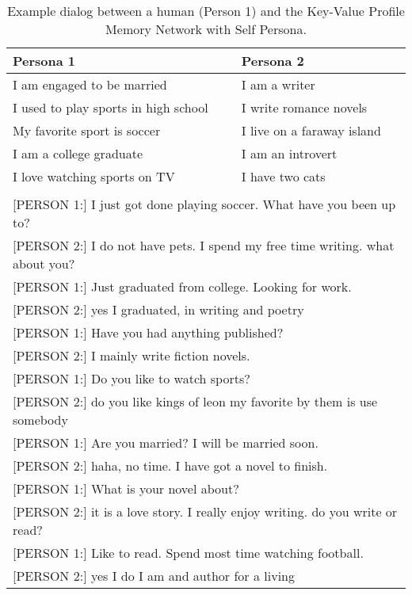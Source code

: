 \begin{table*}[t]
  \begin{center}
    \begin{small}
      \begin{tabular}{l|l}
        \toprule
        \textbf{Persona 1} & \textbf{Persona 2}\\
        \midrule
I am engaged to be married & I am a writer \\ 
I used to play sports in high school & I write romance novels\\
My favorite sport is soccer &  I live on a faraway island \\
I am a college graduate& I am an introvert \\
I love watching sports on TV& I have two cats \\
\bottomrule
\multicolumn{2}{l}{ }\\
\multicolumn{2}{l}{[PERSON 1:] I just got done playing soccer. What have you been up to?}\\
\multicolumn{2}{l}{[PERSON 2:] I do not have pets. I spend my free time writing. what about you?}\\
\multicolumn{2}{l}{[PERSON 1:] Just graduated from college. Looking for work. }\\
\multicolumn{2}{l}{[PERSON 2:] yes I graduated, in writing and poetry}\\
\multicolumn{2}{l}{[PERSON 1:] Have you had anything published?}\\
\multicolumn{2}{l}{[PERSON 2:] I mainly write fiction novels.}\\
\multicolumn{2}{l}{[PERSON 1:] Do you like to watch sports?}\\
\multicolumn{2}{l}{[PERSON 2:] do you like kings of leon my favorite by them is use somebody}\\
\multicolumn{2}{l}{[PERSON 1:] Are you married? I will be married soon. }\\
\multicolumn{2}{l}{[PERSON 2:] haha, no time. I have got a novel to finish.}\\
\multicolumn{2}{l}{[PERSON 1:] What is your novel about?}\\
\multicolumn{2}{l}{[PERSON 2:] it is a love story. I really enjoy writing. do you write or read?}\\
\multicolumn{2}{l}{[PERSON 1:] Like to read. Spend most time watching football. }\\
\multicolumn{2}{l}{[PERSON 2:] yes I do I am and author for a living}\\
      \end{tabular}
      \caption{Example dialog between a human (Person 1) and the Key-Value Profile Memory Network with Self Persona. %
 \label{table:kvp-example}}
    \end{small}
  \end{center}
\end{table*}

